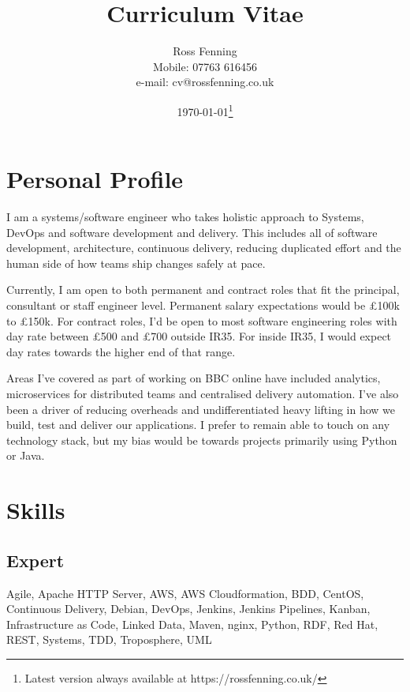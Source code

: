 \documentclass[10pt]{article}
\begin{document}
\title{\bf{Curriculum Vitae}}
\author{
  Ross Fenning\\
  Mobile: 07763 616456\\
  e-mail: cv@rossfenning.co.uk
}

\date{\today\footnote{Latest version always available at https://rossfenning.co.uk/}}
\maketitle

\vspace{-0.5cm}

\hrulefill

\section*{Personal Profile}

I am a systems/software engineer who takes holistic approach to
Systems, DevOps and software development and delivery.
This includes all of software development, architecture, continuous delivery,
reducing duplicated effort and the human side of how teams ship changes safely
at pace.

Currently, I am open to both permanent and contract roles that fit the
principal, consultant or staff engineer level.
Permanent salary expectations would be £100k to £150k.
For contract roles, I'd be open to most software
engineering roles with day rate between £500 and £700 outside IR35.
For inside IR35, I would expect day rates towards the higher end of that range.

Areas I've covered as part of working on BBC online have included analytics,
microservices for distributed teams and centralised delivery automation.
I've  also been a driver of reducing overheads and undifferentiated heavy
lifting in how we build, test and deliver our applications.
I prefer to remain able to touch on any technology stack, but my bias would
be towards projects primarily using Python or Java.


\section*{Skills}


\subsection*{Expert}

Agile, Apache HTTP Server, AWS, AWS Cloudformation, BDD, CentOS, Continuous Delivery, Debian, DevOps, Jenkins, Jenkins Pipelines, Kanban, Infrastructure as Code, Linked Data, Maven, nginx, Python, RDF, Red Hat, REST, Systems, TDD, Troposphere, UML
\end{document}
